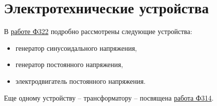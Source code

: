 \chapter{Электротехнические устройства}

	В \href{http://google.com}{работе Ф322} подробно рассмотрены следующие
    устройства:
	\begin{itemize}
        \item генератор синусоидального напряжения,
        \item генератор постоянного напряжения,
        \item электродвигатель постоянного напряжения.
	\end{itemize}
	
	Еще одному устройству -- трансформатору -- посвящена
    \href{http://google.com}{работа Ф314}.
